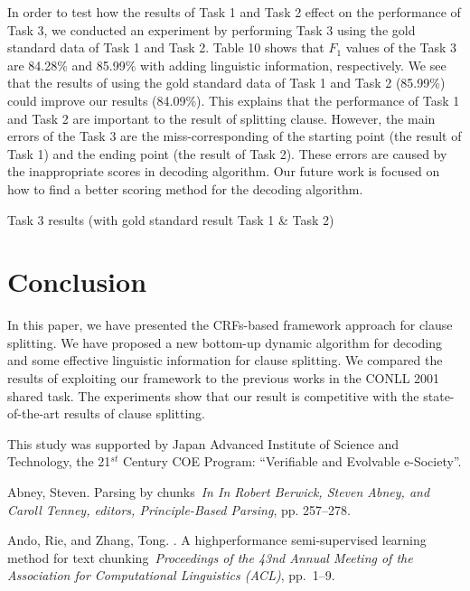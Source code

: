 \documentclass[english]{jnlp_1.4}
\begin{document}
{In order to test how  the results of Task 1 and Task 2 effect on
the performance of Task 3, we conducted an experiment by
performing Task 3 using the gold standard data of Task 1 and Task
2.  Table 10 shows that $F_1$ values of the Task 3 are 84.28\% and
85.99\% with adding linguistic information, respectively. We see
that the results of using the gold standard data of Task 1 and
Task 2 (85.99\%) could improve our results (84.09\%). This
explains that the performance of Task 1 and Task 2 are important
to the result of splitting clause. However, the main errors of the
Task 3 are the miss-corresponding of the starting point (the
result of Task 1) and the ending point (the result of Task 2).
These errors are caused by the inappropriate scores in decoding
algorithm. Our future work is focused on how to find a better
scoring method for the decoding algorithm.

\begin{table}[t]
\caption{Task 3 results (with gold standard result Task 1 \& Task 2)}

\end{table}



\section{Conclusion}

In this paper, we have presented the CRFs-based framework approach
for clause splitting. We have proposed a new bottom-up dynamic
algorithm for decoding and some effective linguistic information
for clause splitting. We compared the results of exploiting our
framework to the previous works in the CONLL 2001 shared task. The
experiments show that our result is competitive with the
state-of-the-art results of clause splitting.

\acknowledgment

This study was supported by Japan Advanced Institute of Science
and Technology, the 21$^{st}$ Century  COE Program: ``Verifiable
and Evolvable e-Society''.


\begin{thebibliography}{}

Abney, Steven\BBCP.
\newblock \BBOQ Parsing by chunks\BBCQ\
\newblock \emph{In In Robert Berwick, Steven
Abney, and Caroll Tenney, editors, Principle-Based Parsing}, pp.
257--278.

Ando, Rie, and Zhang, Tong. \BBOP 2005\BBCP. \newblock \BBOQ A
highperformance semi-supervised learning method for text
chunking\BBCQ\ \newblock \textit{Proceedings of the 43nd Annual
Meeting of the Association for Computational Linguistics (ACL)},
pp.~1--9.


\end{thebibliography}}
\end{document}
